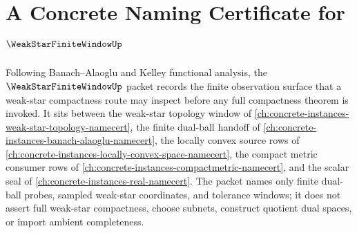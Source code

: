 \chapter{A Concrete Naming Certificate for $\WeakStarFiniteWindowUp$}
\label{ch:concrete-instances-weak-star-finite-window-namecert}

Following Banach--Alaoglu and Kelley functional analysis, the $\WeakStarFiniteWindowUp$ packet records the finite observation surface that a weak-star compactness route may inspect before any full compactness theorem is invoked. It sits between the weak-star topology window of \autoref{ch:concrete-instances-weak-star-topology-namecert}, the finite dual-ball handoff of \autoref{ch:concrete-instances-banach-alaoglu-namecert}, the locally convex source rows of \autoref{ch:concrete-instances-locally-convex-space-namecert}, the compact metric consumer rows of \autoref{ch:concrete-instances-compactmetric-namecert}, and the scalar seal of \autoref{ch:concrete-instances-real-namecert}. The packet names only finite dual-ball probes, sampled weak-star coordinates, and tolerance windows; it does not assert full weak-star compactness, choose subnets, construct quotient dual spaces, or import ambient completeness.

